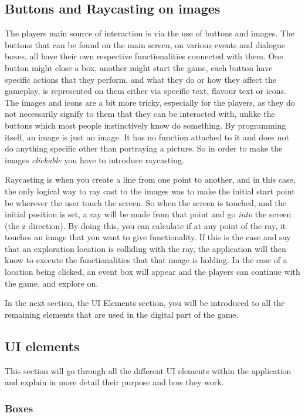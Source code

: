 \subsection{Buttons and Raycasting on images}
The players main source of interaction is via the use of buttons and images. The buttons that can be found on the main screen, on various events and dialogue boxes, all have their own respective functionalities connected with them. One button might close a box, another might start the game, each button have specific actions that they perform, and what they do or how they affect the gameplay, is represented on them either via specific text, flavour text or icons.
The images and icons are a bit more tricky, especially for the players, as they do not necessarily signify to them that they can be interacted with, unlike the buttons which most people instinctively know do something.
By programming itself, an image is just an image. It has no function attached to it and does not do anything specific other than portraying a picture. So in order to make the images \textit{clickable} you have to introduce raycasting.

Raycasting is when you create a line from one point to another, and in this case, the only logical way to ray cast to the images was to make the initial start point be wherever the user touch the screen. So when the screen is touched, and the initial position is set, a ray will be made from that point and go \textit{into} the screen (the z direction). By doing this, you can calculate if at any point of the ray, it touches an image that you want to give functionality. If this is the case and say that an exploration location is colliding with the ray, the application will then know to execute the functionalities that that image is holding. In the case of a location being clicked, an event box will appear and the players can continue with the game, and explore on.

In the next section, the UI Elements section, you will be introduced to all the remaining elements that are used in the digital part of the game.

\subsection{UI elements}
This section will go through all the different UI elements within the application and explain in more detail their purpose and how they work.

\subsubsection{Boxes}

